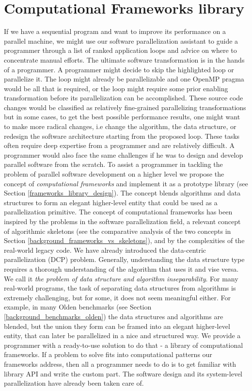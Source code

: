 \section{Computational Frameworks library}
\label{introduction_frameworks}
\quad If we have a sequential program and want to improve its performance on a parallel machine, we might use our software parallelization assistant to guide a programmer through a list of ranked application loops and advice on where to concentrate manual efforts. The ultimate software transformation is in the hands of a programmer. A programmer might decide to skip the highlighted loop or parallelize it. The loop might already be parallelizable and one OpenMP pragma would be all that is required, or the loop might require some prior enabling transformation before its parallelization can be accomplished. These source code changes would be classified as relatively fine-grained parallelizing transformations but in some cases, to get the best possible performance results, one might want to make more radical changes, i.e change the algorithm, the data structure, or redesign the software architecture starting from the proposed loop. These tasks often require deep expertise from a programmer and are relatively difficult. A programmer would also face the same challenges if he was to design and develop parallel software from the scratch.\newline\null
\quad To assist a programmer in tackling the problem of parallel software development on a higher level we propose the concept of \textit{computational frameworks} and implement it as a prototype library (see Section \ref{frameworks_library_design}). The concept blends algorithms and data structures to form an elegant higher-level entity that could be used as a parallelization primitive. The concept of computational frameworks has been inspired by the problems in the software parallelization field, a relevant concept of algorithmic skeletons (see the comparative analysis of the two concepts in Section \ref{background_frameworks_vs_skeletons}), and by the complexities of the real-world legacy code. We have already introduced the data-centric parallelization (DCP) problem. Generally, understanding the data structure type requires a thorough understanding of the algorithm that uses it and vise versa. We call it \textit{the problem of data structure and algorithm inseparability}. For many real-world programs, the task of separating data structures from algorithms is extremely challenging, but for some, it does not seem meaningful either. For example, in many Olden benchmarks (see Section \ref{background_benchmarks_olden}) the data structures and algorithms are blended, but the union they form can be framed into an elegant higher-level entity, that can later be parallelized in a nice and structured way. We provide a programmer with a ready-to-use solution to do that - a library of computational frameworks. If a problem to solve fits into computational patterns our frameworks address, then all a programmer needs to do is to get familiar with library API and write the custom part. The software design and its system-level parallelization have already been taken care of.\newline\null 
